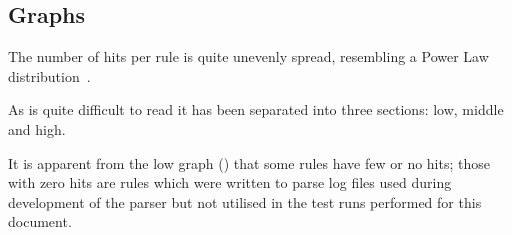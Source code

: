 \subsection{Graphs}

The number of hits per rule is quite unevenly spread, resembling a Power
Law distribution~\cite{powerlaw}.


As  is quite difficult to read it has
been separated into three sections: low, middle and high.


It is apparent from the low graph ()
that some rules have few or no hits; those with zero hits are rules which
were written to parse log files used during development of the parser but
not utilised in the test runs performed for this document.



\clearpage{}
